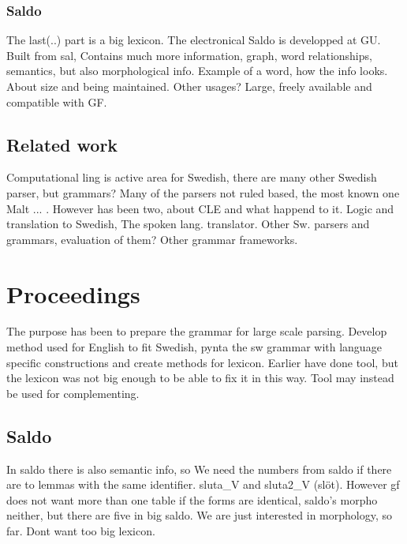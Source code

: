 \documentclass{report}
\begin{document}
\subsection{Saldo}
The last(..) part is a big lexicon. The electronical Saldo is developped at GU.
Built from sal,
Contains much more information,
graph, word relationships, semantics, but also morphological info.
Example of a word, how the info looks.
About size and being maintained. Other usages?
Large, freely available and compatible with GF. 

\section{Related work}
Computational ling is active area for Swedish, there are many other Swedish parser,
but grammars?
Many of the parsers not ruled based, the most known one Malt ... .
However has been two, about CLE and what happend to it. Logic and translation
to Swedish, The spoken lang. translator.
Other Sw. parsers and grammars, evaluation of them? 
Other grammar frameworks.

\chapter{Proceedings}
 The purpose has been to prepare the grammar for large scale parsing.
 Develop method used for English to fit Swedish, pynta the sw grammar with
 language specific constructions and create methods for lexicon.
 Earlier have done tool, but the lexicon was not big enough to be able
 to fix it in this way. Tool may instead be used for complementing.

\section{Saldo}
In saldo there is also semantic info, so
We need the numbers from saldo if there are to lemmas with the same
identifier. sluta\_V and sluta2\_V (slöt). However gf does not want more than one table
if the forms are identical, saldo's morpho neither, but there are five in big saldo. 
We are just interested in morphology, so far. Dont want too big lexicon.
\end{document}
